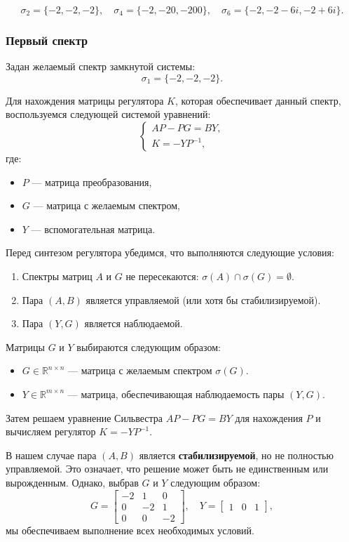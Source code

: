 \[
\sigma_2 = \{-2, -2, -2\}, \quad
\sigma_4 = \{-2, -20, -200\}, \quad
\sigma_6 = \{-2, -2 - 6i, -2 + 6i\}.
\]

\subsubsection{Первый спектр}
Задан желаемый спектр замкнутой системы:
\[
\sigma_1 = \{-2, -2, -2\}.
\]

Для нахождения матрицы регулятора $K$, которая обеспечивает данный спектр, воспользуемся следующей системой уравнений:
\[
\begin{cases}
AP - PG = BY, \\
K = -Y P^{-1},
\end{cases}
\]
где:
\begin{itemize}
    \item $P$ — матрица преобразования,
    \item $G$ — матрица с желаемым спектром,
    \item $Y$ — вспомогательная матрица.
\end{itemize}

Перед синтезом регулятора убедимся, что выполняются следующие условия:
\begin{enumerate}
    \item Спектры матриц $A$ и $G$ не пересекаются: $\sigma(A) \cap \sigma(G) = \emptyset$.
    \item Пара $(A, B)$ является управляемой (или хотя бы стабилизируемой).
    \item Пара $(Y, G)$ является наблюдаемой.
\end{enumerate}

Матрицы $G$ и $Y$ выбираются следующим образом:
\begin{itemize}
    \item $G \in \mathbb{R}^{n \times n}$ — матрица с желаемым спектром $\sigma(G)$.
    \item $Y \in \mathbb{R}^{m \times n}$ — матрица, обеспечивающая наблюдаемость пары $(Y, G)$.
\end{itemize}

Затем решаем уравнение Сильвестра $AP - PG = BY$ для нахождения $P$ и вычисляем регулятор $K = -Y P^{-1}$.

В нашем случае пара $(A, B)$ является \textbf{стабилизируемой}, но не полностью управляемой. Это означает, что решение может быть не единственным или вырожденным. Однако, выбрав $G$ и $Y$ следующим образом:
\[
G = \begin{bmatrix}
-2 & 1 & 0 \\
0 & -2 & 1 \\
0 & 0 & -2
\end{bmatrix}, \quad
Y = \begin{bmatrix}
1 & 0 & 1
\end{bmatrix},
\]
мы обеспечиваем выполнение всех необходимых условий.

